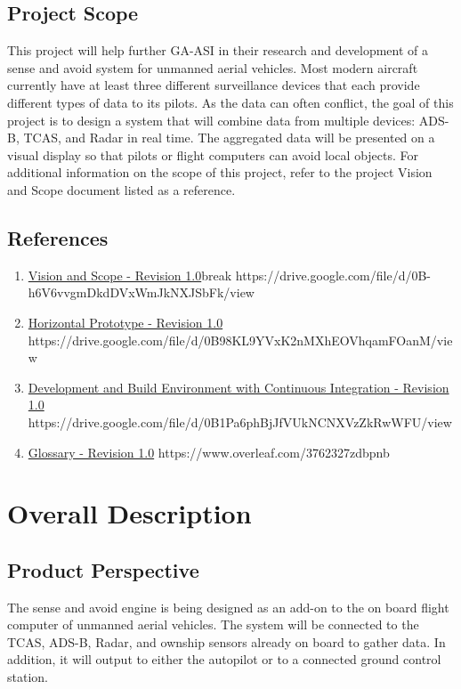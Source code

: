 \documentclass[12pt,oneside,letterpaper]{article}
\begin{document}
\subsection{Project Scope}
This project will help further GA-ASI in their research and development of a sense and avoid system for unmanned aerial vehicles. Most modern aircraft currently have at least three different surveillance devices that each provide different types of data to its pilots. As the data can often conflict, the goal of this project is to design a system that will combine data from multiple devices: ADS-B, TCAS, and Radar in real time. The aggregated data will be presented on a visual display so that pilots or flight computers can avoid local objects. For additional information on the scope of this project, refer to the project Vision and Scope document listed as a reference.

\subsection{References}
\begin{enumerate}
\item\href{https://drive.google.com/file/d/0B-h6V6vvgmDkdDVxWmJkNXJSbFk/view}{Vision and Scope - Revision 1.0}break
\newline https://drive.google.com/file/d/0B-h6V6vvgmDkdDVxWmJkNXJSbFk/view
\item\href{https://drive.google.com/file/d/0B98KL9YVxK2nMXhEOVhqamFOanM/view}{Horizontal Prototype - Revision 1.0}
\newline https://drive.google.com/file/d/0B98KL9YVxK2nMXhEOVhqamFOanM/view
\item\href{https://drive.google.com/file/d/0B1Pa6phBjJfVUkNCNXVzZkRwWFU/view}{Development and Build Environment with Continuous Integration - Revision 1.0}
\newline https://drive.google.com/file/d/0B1Pa6phBjJfVUkNCNXVzZkRwWFU/view
\item\href{https://www.overleaf.com/3762327zdbpnb}{Glossary - Revision 1.0}
\newline https://www.overleaf.com/3762327zdbpnb
\end{enumerate}

\section{Overall Description}
\subsection{Product Perspective}
The sense and avoid engine is being designed as an add-on to the on board flight computer of unmanned aerial vehicles. The system will be connected to the TCAS, ADS-B, Radar, and ownship sensors already on board to gather data. In addition, it will output to either the autopilot or to a connected ground control station.\newline
\end{document}

